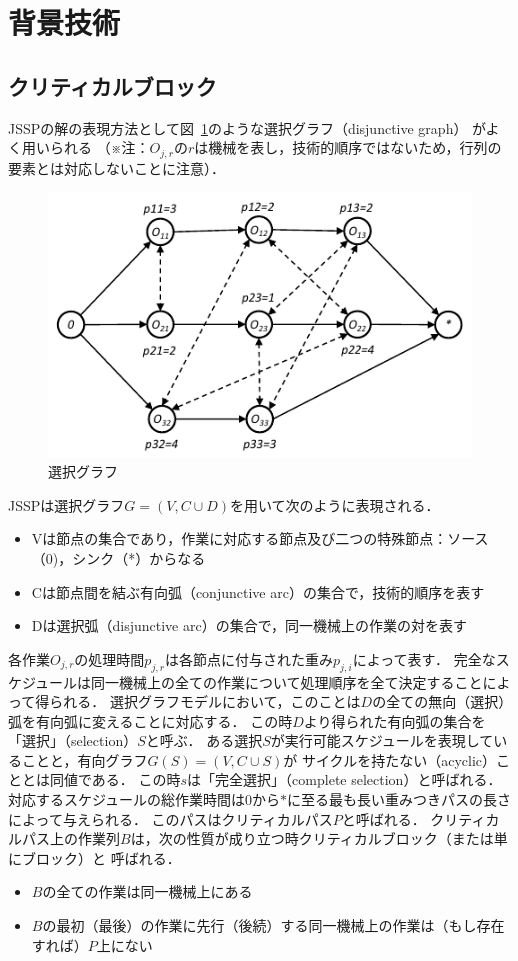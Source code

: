 \documentclass{jsarticle}
\begin{document}
\section{背景技術}
\subsection{クリティカルブロック}
JSSPの解の表現方法として図~\ref{fig:disjunctive_graph}のような選択グラフ（disjunctive graph）
がよく用いられる
（※注：$O_{j,r}$の$r$は機械を表し，技術的順序ではないため，行列の要素とは対応しないことに注意）．

\begin{figure}[H]
	\centering
	\includegraphics{figures/disjunctive_graph.pdf}
	\caption{選択グラフ}
	\label{fig:disjunctive_graph}
\end{figure}

JSSPは選択グラフ$G=(V,C\cup D)$を用いて次のように表現される．
\begin{itemize}
	\item Vは節点の集合であり，作業に対応する節点及び二つの特殊節点：ソース（0)，シンク（*）からなる
	\item Cは節点間を結ぶ有向弧（conjunctive arc）の集合で，技術的順序を表す
	\item Dは選択弧（disjunctive arc）の集合で，同一機械上の作業の対を表す
\end{itemize}
各作業$O_{j,r}$の処理時間$p_{j,r}$は各節点に付与された重み$p_{j,i}$によって表す．
完全なスケジュールは同一機械上の全ての作業について処理順序を全て決定することによって得られる．
選択グラフモデルにおいて，このことは$D$の全ての無向（選択）弧を有向弧に変えることに対応する．
この時$D$より得られた有向弧の集合を「選択」（selection）$S$と呼ぶ．
ある選択$S$が実行可能スケジュールを表現していることと，有向グラフ$G(S)=(V,C\cup S)$が
サイクルを持たない（acyclic）こととは同値である．
この時$s$は「完全選択」（complete selection）と呼ばれる．
対応するスケジュールの総作業時間は$0$から$*$に至る最も長い重みつきパスの長さによって与えられる．
このパスはクリティカルパス$P$と呼ばれる．
クリティカルパス上の作業列$B$は，次の性質が成り立つ時クリティカルブロック（または単にブロック）と
呼ばれる．
\begin{itemize}
	\item $B$の全ての作業は同一機械上にある
	\item $B$の最初（最後）の作業に先行（後続）する同一機械上の作業は（もし存在すれば）$P$上にない
\end{itemize}
\end{document}

